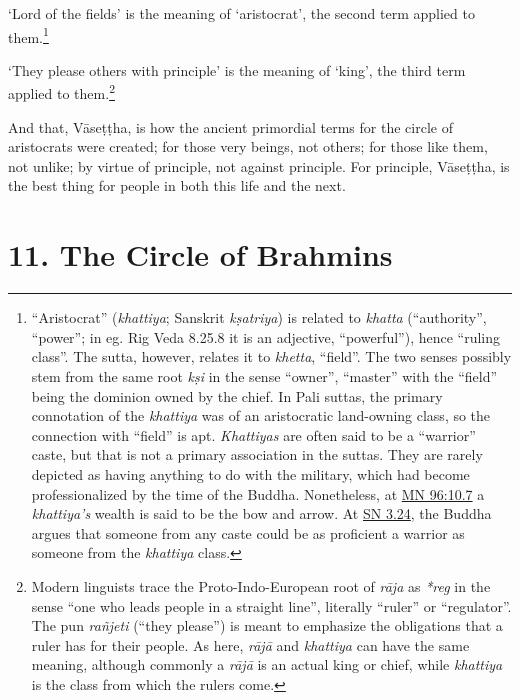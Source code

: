 \documentclass[12pt,openany]{book}%
\begin{document}
‘Lord of the fields’ is the meaning of ‘aristocrat’, the second term applied to them.\footnote{“Aristocrat” (\textit{khattiya}; Sanskrit \textit{\textsanskrit{kṣatriya}}) is related to \textit{khatta} (“authority”, “power”; in eg. Rig Veda 8.25.8 it is an adjective, “powerful”), hence “ruling class”. The sutta, however, relates it to \textit{khetta}, “field”. The two senses possibly stem from the same root \textit{\textsanskrit{kṣi}} in the sense “owner”, “master” with the “field” being the dominion owned by the chief. In Pali suttas, the primary connotation of the \textit{khattiya} was of an aristocratic land-owning class, so the connection with “field” is apt. \textit{Khattiyas} are often said to be a “warrior” caste, but that is not a primary association in the suttas. They are rarely depicted as having anything to do with the military, which had become professionalized by the time of the Buddha. Nonetheless, at \href{https://suttacentral.net/mn96/en/sujato\#10.7}{MN 96:10.7} a \textit{khattiya’s} wealth is said to be the bow and arrow. At \href{https://suttacentral.net/sn3.24/en/sujato}{SN 3.24}, the Buddha argues that someone from any caste could be as proficient a warrior as someone from the \textit{khattiya} class. } 

‘They please others with principle’ is the meaning of ‘king’, the third term applied to them.\footnote{Modern linguists trace the Proto-Indo-European root of \textit{\textsanskrit{rāja}} as \textit{*reg} in the sense “one who leads people in a straight line”, literally “ruler” or “regulator”. The pun \textit{\textsanskrit{rañjeti}} (“they please”) is meant to emphasize the obligations that a ruler has for their people. As here, \textit{\textsanskrit{rājā}} and \textit{khattiya} can have the same meaning, although commonly a \textit{\textsanskrit{rājā}} is an actual king or chief, while \textit{khattiya} is the class from which the rulers come. } 

And that, \textsanskrit{Vāseṭṭha}, is how the ancient primordial terms for the circle of aristocrats were created; for those very beings, not others; for those like them, not unlike; by virtue of principle, not against principle. For principle, \textsanskrit{Vāseṭṭha}, is the best thing for people in both this life and the next. 

\section*{11. The Circle of Brahmins }
\end{document}
